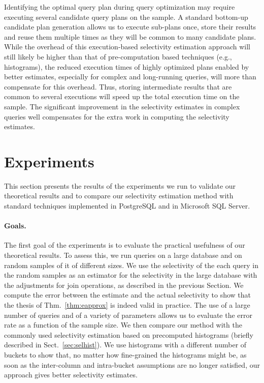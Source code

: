Identifying the optimal query plan during query optimization may
require executing several candidate query plans on the sample. A standard
bottom-up candidate plan generation allows us to execute sub-plans once, store
their results and reuse them multiple times as they will be common to many
candidate plans. While the overhead of this execution-based selectivity
estimation approach will still likely be higher than that of pre-computation
based techniques (e.g., histograms),  the reduced execution times of highly
optimized plans enabled by better estimates, especially for complex and
long-running queries, will more than compensate for this overhead.   
Thus, storing intermediate results that are common to several executions will speed up
the total execution time on the sample. The significant improvement in the
selectivity estimates in complex queries well compensates for the extra work in
computing the selectivity estimates.

\section{Experiments}\label{sec:experiments}
This section presents the results of the experiments we run to validate our
theoretical results and to compare our selectivity estimation
method with standard techniques implemented in PostgreSQL and in
Microsoft SQL Server.

\paragraph{Goals.} The first goal of the experiments is to evaluate the practical
usefulness of our theoretical results. To assess this, we run queries on a large
database and on random samples of it of different sizes. We use the selectivity
of the each query in the random samples as an estimator for the selectivity in
the large database with the adjustments for join operations, as
described in the previous Section. We compute the error between the
estimate and the actual selectivity to show that the thesis of
Thm.~\ref{thm:eapprox} is indeed valid in practice. The use of a large number
of queries and of a variety of parameters allows us to evaluate the error
rate as a function of the sample size. We then compare our
method with the commonly used selectivity estimation based  on precomputed
histograms (briefly described in Sect.~\ref{sec:selhist}). We use histograms
with a different number of buckets to show that, no matter how fine-grained the
histograms might be, as soon as the inter-column and intra-bucket assumptions
are no longer satisfied, our approach gives better selectivity
estimates.

